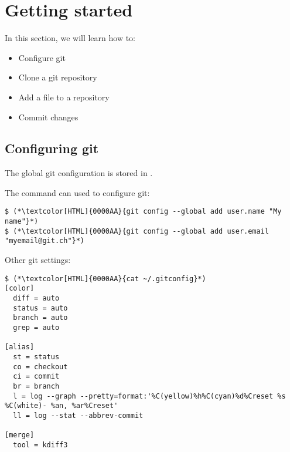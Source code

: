 \section{Getting started}
\begin{frame}[fragile]
  \slidetitle

  In this section, we will learn how to:
  \begin{itemize}
    \item Configure git
    \item Clone a git repository
    \item Add a file to a repository
    \item Commit changes
  \end{itemize}
\end{frame}

\subsection{Configuring git}
\begin{frame}[fragile]
  \subslidetitle
  The global git configuration is stored in .
  \\
  \vspace{1em}

  The command  can used to configure git:
  \begin{lstlisting}
$ (*\textcolor[HTML]{0000AA}{git config --global add user.name "My name"}*)
$ (*\textcolor[HTML]{0000AA}{git config --global add user.email "myemail@git.ch"}*)
  \end{lstlisting}

  Other git settings:
  \begin{lstlisting}[basicstyle=\small\ttfamily\bfseries]
$ (*\textcolor[HTML]{0000AA}{cat ~/.gitconfig}*)
[color]
  diff = auto
  status = auto
  branch = auto
  grep = auto

[alias]
  st = status
  co = checkout
  ci = commit
  br = branch
  l = log --graph --pretty=format:'%C(yellow)%h%C(cyan)%d%Creset %s %C(white)- %an, %ar%Creset'
  ll = log --stat --abbrev-commit

[merge]
  tool = kdiff3
  \end{lstlisting}

\end{frame}


